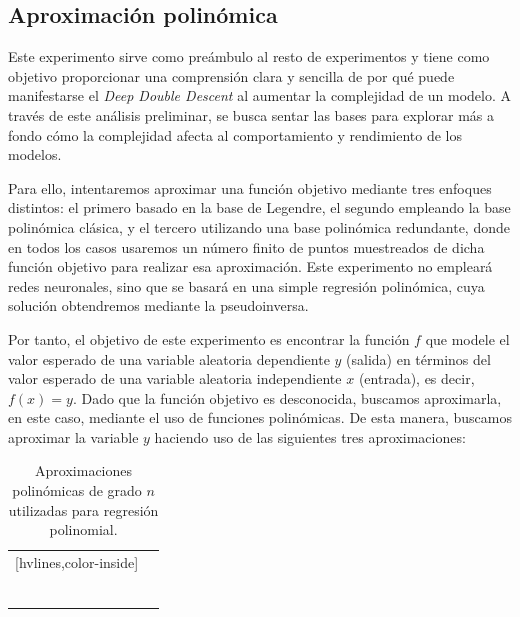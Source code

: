 \subsection{Aproximación polinómica}\label{subsec:approx-polinomica}

Este experimento sirve como preámbulo al resto de experimentos y tiene como objetivo proporcionar una comprensión clara y sencilla de por qué puede manifestarse el \textit{Deep Double Descent} al aumentar la complejidad de un modelo. A través de este análisis preliminar, se busca sentar las bases para explorar más a fondo cómo la complejidad afecta al comportamiento y rendimiento de los modelos.

Para ello, intentaremos aproximar una función objetivo mediante tres enfoques distintos: el primero basado en la base de Legendre, el segundo empleando la base polinómica clásica, y el tercero utilizando una base polinómica redundante, donde en todos los casos usaremos un número finito de puntos muestreados de dicha función objetivo para realizar esa aproximación. Este experimento no empleará redes neuronales, sino que se basará en una simple regresión polinómica, cuya solución obtendremos mediante la pseudoinversa.

Por tanto, el objetivo de este experimento es encontrar la función $f$ que modele el valor esperado de una variable aleatoria dependiente $y$ (salida) en términos del valor esperado de una variable aleatoria independiente $x$ (entrada), es decir, $f(x)=y$. Dado que la función objetivo es desconocida, buscamos aproximarla, en este caso, mediante el uso de funciones polinómicas. De esta manera, buscamos aproximar la variable $y$ haciendo uso de las siguientes tres aproximaciones:

\begin{table}[h]
    \centering
    \begin{NiceTabular}{c c}[hvlines,color-inside]
         &  \\ 
        
         &  \\ \\

         &   \\ \\

         &   \\ \\

    \end{NiceTabular}
    \caption{Aproximaciones polinómicas de grado $n$ utilizadas para regresión polinomial.}\label{tabla:aproximaciones-polinomicas}
\end{table}

